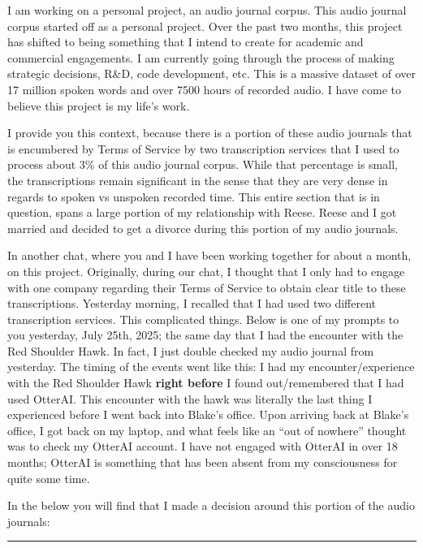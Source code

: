 \documentclass{article}
\begin{document}
I am working on a personal project, an audio journal corpus. This audio
journal corpus started off as a personal project. Over the past two
months, this project has shifted to being something that I intend to
create for academic and commercial engagements. I am currently going
through the process of making strategic decisions, R\&D, code
development, etc. This is a massive dataset of over 17 million spoken
words and over 7500 hours of recorded audio. I have come to believe this
project is my life's work.

I provide you this context, because there is a portion of these audio
journals that is encumbered by Terms of Service by two transcription
services that I used to process about 3\% of this audio journal corpus.
While that percentage is small, the transcriptions remain significant in
the sense that they are very dense in regards to spoken vs unspoken
recorded time. This entire section that is in question, spans a large
portion of my relationship with Reese. Reese and I got married and
decided to get a divorce during this portion of my audio journals.

In another chat, where you and I have been working together for about a
month, on this project. Originally, during our chat, I thought that I
only had to engage with one company regarding their Terms of Service to
obtain clear title to these transcriptions. Yesterday morning, I
recalled that I had used two different transcription services. This
complicated things. Below is one of my prompts to you yesterday, July
25th, 2025; the same day that I had the encounter with the Red Shoulder
Hawk. In fact, I just double checked my audio journal from yesterday.
The timing of the events went like this: I had my encounter/experience
with the Red Shoulder Hawk \textbf{right before} I found out/remembered
that I had used OtterAI. This encounter with the hawk was literally the
last thing I experienced before I went back into Blake's office. Upon
arriving back at Blake's office, I got back on my laptop, and what feels
like an ``out of nowhere'' thought was to check my OtterAI account. I
have not engaged with OtterAI in over 18 months; OtterAI is something
that has been absent from my consciousness for quite some time.

In the below you will find that I made a decision around this portion of
the audio journals:

\begin{center}\rule{0.5\linewidth}{0.5pt}\end{center}
\end{document}
